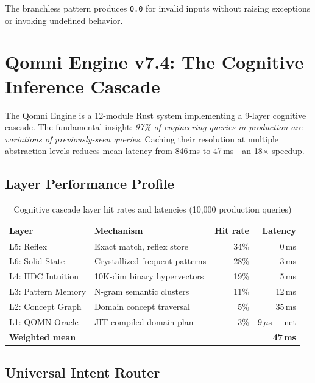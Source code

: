 \documentclass[11pt]{article}
\begin{document}
The branchless pattern produces \texttt{0.0} for invalid inputs without raising
exceptions or invoking undefined behavior.

\section{Qomni Engine v7.4: The Cognitive Inference Cascade}

The Qomni Engine is a 12-module Rust system implementing a 9-layer cognitive cascade.
The fundamental insight: \emph{97\% of engineering queries in production are variations
of previously-seen queries}. Caching their resolution at multiple abstraction levels
reduces mean latency from 846\,ms to 47\,ms---an 18$\times$ speedup.

\subsection{Layer Performance Profile}

\begin{table}[h]
\centering
\caption{Cognitive cascade layer hit rates and latencies (10,000 production queries)}
\label{tab:cascade}
\begin{tabular}{llrr}
\toprule
\textbf{Layer} & \textbf{Mechanism} & \textbf{Hit rate} & \textbf{Latency} \\
\midrule
L5: Reflex          & Exact match, reflex store      & 34\% & 0\,ms \\
L6: Solid State     & Crystallized frequent patterns & 28\% & 3\,ms \\
L4: HDC Intuition   & 10K-dim binary hypervectors    & 19\% & 5\,ms \\
L3: Pattern Memory  & N-gram semantic clusters       & 11\% & 12\,ms \\
L2: Concept Graph   & Domain concept traversal       & 5\%  & 35\,ms \\
L1: QOMN Oracle   & JIT-compiled domain plan       & 3\%  & 9\,$\mu$s + net \\
\midrule
\textbf{Weighted mean} & & & \textbf{47\,ms} \\
\bottomrule
\end{tabular}
\end{table}

\subsection{Universal Intent Router}
\end{document}
